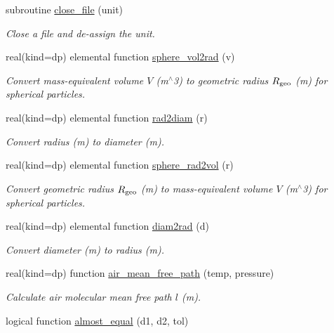 \begin{DoxyCompactItemize}
subroutine \mbox{\hyperlink{namespacepmc__util_ac91736b4f44a1623208ebe7f161e84ad}{close\+\_\+file}} (unit)
\begin{DoxyCompactList}\small\item\em Close a file and de-\/assign the unit. \end{DoxyCompactList}\item 
real(kind=dp) elemental function \mbox{\hyperlink{namespacepmc__util_af905c1127f64dd471808b872022ed632}{sphere\+\_\+vol2rad}} (v)
\begin{DoxyCompactList}\small\item\em Convert mass-\/equivalent volume $V$ (m$^\wedge$3) to geometric radius $R_{\rm geo}$ (m) for spherical particles. \end{DoxyCompactList}\item 
real(kind=dp) elemental function \mbox{\hyperlink{namespacepmc__util_a69ab911167fab93d371e42476e9aac73}{rad2diam}} (r)
\begin{DoxyCompactList}\small\item\em Convert radius (m) to diameter (m). \end{DoxyCompactList}\item 
real(kind=dp) elemental function \mbox{\hyperlink{namespacepmc__util_a30ef7112d68a812b3022046e0f3a40be}{sphere\+\_\+rad2vol}} (r)
\begin{DoxyCompactList}\small\item\em Convert geometric radius $R_{\rm geo}$ (m) to mass-\/equivalent volume $V$ (m$^\wedge$3) for spherical particles. \end{DoxyCompactList}\item 
real(kind=dp) elemental function \mbox{\hyperlink{namespacepmc__util_ab0ce0deb86bd2e48734d7e654e5c3b18}{diam2rad}} (d)
\begin{DoxyCompactList}\small\item\em Convert diameter (m) to radius (m). \end{DoxyCompactList}\item 
real(kind=dp) function \mbox{\hyperlink{namespacepmc__util_abd28fa58b98f202bfa9e4f4bcd3a7608}{air\+\_\+mean\+\_\+free\+\_\+path}} (temp, pressure)
\begin{DoxyCompactList}\small\item\em Calculate air molecular mean free path $l$ (m). \end{DoxyCompactList}\item 
logical function \mbox{\hyperlink{namespacepmc__util_a7bc605f9cb5389d88d233bcecfbfc858}{almost\+\_\+equal}} (d1, d2, tol)

\end{DoxyCompactItemize}
